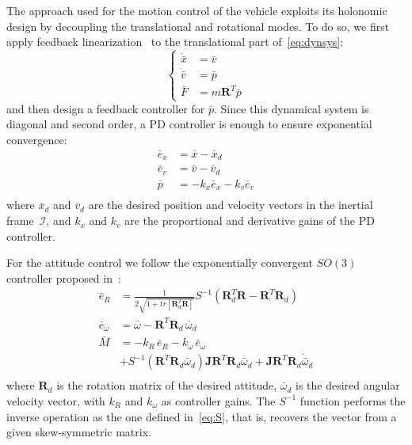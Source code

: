 \documentclass{article}
\begin{document}
The approach used for the motion control of the vehicle exploits its
holonomic design by
decoupling the translational and rotational modes. To do so, we first
apply feedback linearization~\cite{sastry99} to the translational part
of~\eqref{eq:dynsys}:
\begin{equation}
  \label{eq:fctrl}
    \left\{
    \begin{aligned}
      \dot{\bar{x}} &= \bar{v} \\
      \dot{\bar{v}} &= \bar{p} \\
      \bar{F} &= m \mathbf{R}^T \bar{p}
    \end{aligned}
  \right.
\end{equation}
and then design a feedback controller for $\bar{p}$. Since this
dynamical system is diagonal and second order, a PD controller is
enough to ensure exponential
convergence:
\begin{equation}
  \label{eq:pctrl}
  \begin{aligned}
    \bar{e}_x &= \bar{x} - \bar{x}_d \\
    \bar{e}_v &= \bar{v} - \bar{v}_d \\
    \bar{p} &= -k_x \bar{e}_x -k_v \bar{e}_v \\
  \end{aligned}
\end{equation}
where $\bar{x}_d$ and $\bar{v}_d$ are the desired position and
velocity vectors in the inertial frame~$\mathcal{I}$, and $k_x$ and
$k_v$ are the proportional and derivative gains of the PD controller.

For the attitude control we follow the exponentially convergent $SO(3)$ controller
proposed in~\cite{lee12}:
\begin{equation}
  \label{eq:mctrl}
  \begin{aligned}
    \bar{e}_R &= \frac{1}{2 \sqrt{1+tr[\mathbf{R}^T_d\mathbf{R}]} } S^{-1}( \mathbf{R}^T_d \mathbf{R} -
    \mathbf{R}^T \mathbf{R}_d ) \\
    \bar{e}_\omega &= \bar{\omega} - \mathbf{R}^T
    \mathbf{R}_d\,\bar{\omega}_d \\
    \bar{M} &= -k_R\,\bar{e}_R - k_\omega\,\bar{e}_\omega \\
    &+S^{-1}(\mathbf{R}^T\mathbf{R}_d\bar{\omega}_d)\mathbf{J}\mathbf{R}^T\mathbf{R}_d\bar{\omega}_d 
    +\mathbf{J}\mathbf{R}^T\mathbf{R}_d\dot{\bar{\omega}}_d \\
  \end{aligned}
\end{equation}
where $\mathbf{R}_d$ is the rotation matrix of the desired attitude,
$\bar{\omega}_d$ is the desired angular velocity vector, with $k_R$ and
$k_\omega$ as controller gains. The $S^{-1}$ function performs the inverse
operation as the one defined in~\eqref{eq:S}, that is, recovers
the vector from a given skew-symmetric matrix.
\end{document}
